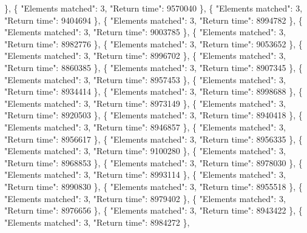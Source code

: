 \}, \{ "Elements matched": 3, "Return time": 9570040 \}, \{ "Elements matched": 3, "Return time": 9404694 \}, \{ "Elements matched": 3, "Return time": 8994782 \}, \{ "Elements matched": 3, "Return time": 9003785 \}, \{ "Elements matched": 3, "Return time": 8982776 \}, \{ "Elements matched": 3, "Return time": 9053652 \}, \{ "Elements matched": 3, "Return time": 8996702 \}, \{ "Elements matched": 3, "Return time": 8860385 \}, \{ "Elements matched": 3, "Return time": 8907345 \}, \{ "Elements matched": 3, "Return time": 8957453 \}, \{ "Elements matched": 3, "Return time": 8934414 \}, \{ "Elements matched": 3, "Return time": 8998688 \}, \{ "Elements matched": 3, "Return time": 8973149 \}, \{ "Elements matched": 3, "Return time": 8920503 \}, \{ "Elements matched": 3, "Return time": 8940418 \}, \{ "Elements matched": 3, "Return time": 8946857 \}, \{ "Elements matched": 3, "Return time": 8956617 \}, \{ "Elements matched": 3, "Return time": 8956335 \}, \{ "Elements matched": 3, "Return time": 9100280 \}, \{ "Elements matched": 3, "Return time": 8968853 \}, \{ "Elements matched": 3, "Return time": 8978030 \}, \{ "Elements matched": 3, "Return time": 8993114 \}, \{ "Elements matched": 3, "Return time": 8990830 \}, \{ "Elements matched": 3, "Return time": 8955518 \}, \{ "Elements matched": 3, "Return time": 8979402 \}, \{ "Elements matched": 3, "Return time": 8976656 \}, \{ "Elements matched": 3, "Return time": 8943422 \}, \{ "Elements matched": 3, "Return time": 8984272 \},

